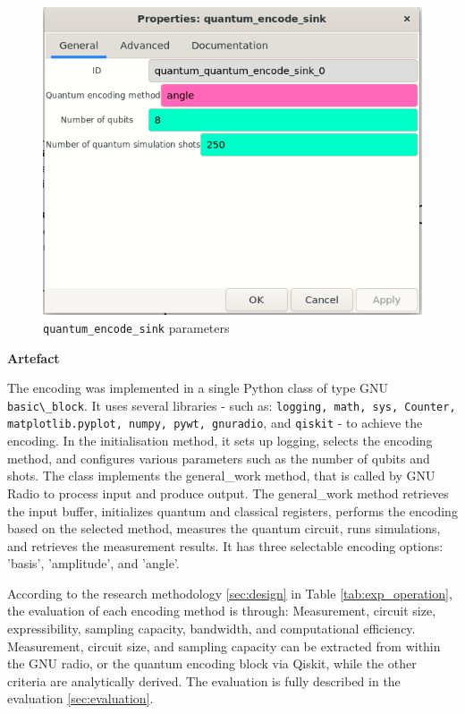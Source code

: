 \begin{figure}[ht]
    \centering
    \includegraphics[width=1\textwidth]{Figures/quantum_encode_sink_parameters.png}
    \caption{\lstinline{quantum_encode_sink} parameters}
    \label{fig:quantum_encode_sink_parameters}
\end{figure}

\textbf{Artefact}

The encoding was implemented in a single Python class of type GNU \lstinline{basic\_block}.
It uses several libraries - such as: \lstinline{logging, math, sys, Counter, matplotlib.pyplot, numpy, pywt, gnuradio}, and \lstinline{qiskit} - to achieve the encoding.
In the initialisation method, it sets up logging, selects the encoding method, and configures various parameters such as the number of qubits and shots.
The class implements the general\_work method, that is called by GNU Radio to process input and produce output.
The general\_work method retrieves the input buffer, initializes quantum and classical registers, performs the encoding based on the selected method, measures the quantum circuit, runs simulations, and retrieves the measurement results.
It has three selectable encoding options: 'basis', 'amplitude', and 'angle'.

According to the research methodology \ref{sec:design} in Table \ref{tab:exp_operation}, the evaluation of each encoding method is through: Measurement, circuit size, expressibility, sampling capacity, bandwidth, and computational efficiency.
Measurement, circuit size, and sampling capacity can be extracted from within the GNU radio, or the quantum encoding block via Qiskit, while the other criteria are analytically derived.
The evaluation is fully described in the evaluation \ref{sec:evaluation}.

